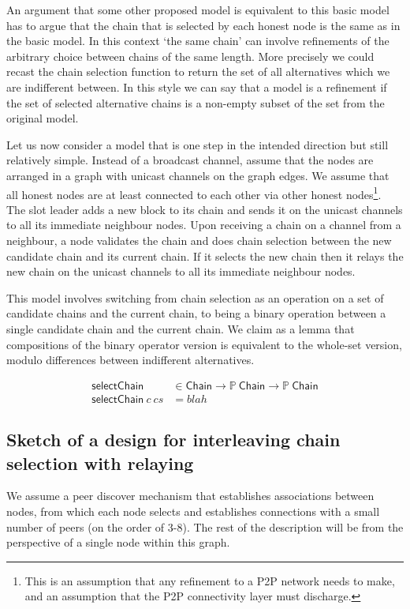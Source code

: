 \documentclass{article}
\theoremstyle{definition}{
  \newtheorem{lemma}{Lemma}[section] %
  \newtheorem{definition}[lemma]{Definition}
}
\theoremstyle{theorem}{
  \newtheorem{invariant}[lemma]{Invariant}
  \newtheorem{proofobligation}[lemma]{Proof Obligation}
}
\numberwithin{equation}{lemma}
\begin{document}
An argument that some other proposed model is equivalent to this basic model
has to argue that the chain that is selected by each honest node is the same
as in the basic model. In this context `the same chain' can involve refinements
of the arbitrary choice between chains of the same length. More precisely we
could recast the chain selection function to return the set of all alternatives
which we are indifferent between. In this style we can say that a model is a
refinement if the set of selected alternative chains is a non-empty subset of
the set from the original model.

Let us now consider a model that is one step in the intended direction but
still relatively simple. Instead of a broadcast channel, assume that the
nodes are arranged in a graph with unicast channels on the graph edges. We
assume that all honest nodes are at least connected to each other via other
honest nodes\footnote{This is an assumption that any refinement to a P2P
network needs to make, and an assumption that the P2P connectivity layer must
discharge.}. The slot leader adds a new block to its chain and sends it on the
unicast channels to all its immediate neighbour nodes. Upon receiving a chain
on a channel from a neighbour, a node validates the chain and does chain
selection between the new candidate chain and its current chain. If it selects
the new chain then it relays the new chain on the unicast channels to all its
immediate neighbour nodes.

This model involves switching from chain selection as an operation on a set of
candidate chains and the current chain, to being a binary operation between a
single candidate chain and the current chain. We claim as a lemma that
compositions of the binary operator version is equivalent to the whole-set
version, modulo differences between indifferent alternatives.

\begin{align*}
\mathsf{selectChain} & \in \mathsf{Chain} \to \mathbb{P}~\mathsf{Chain}
                                          \to \mathbb{P}~\mathsf{Chain} \\
\mathsf{selectChain} ~ c ~ cs & = blah
\end{align*}

\subsection{Sketch of a design for interleaving chain selection with relaying}

We assume a peer discover mechanism that establishes associations between
nodes, from which each node selects and establishes connections with a small
number of peers (on the order of 3-8). The rest of the description will be
from the perspective of a single node within this graph.
\end{document}
